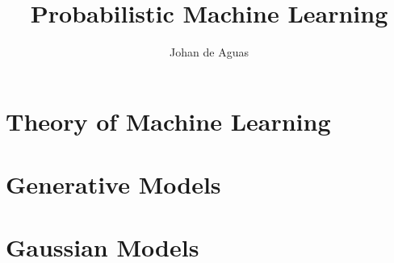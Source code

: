 \documentclass{xclass}
\begin{document}
\begin{titlepage}
    \title{Probabilistic Machine Learning}
    \author{Johan de Aguas}
    \maketitle
\end{titlepage}

\tableofcontents

\chapter{Theory of Machine Learning}



\chapter{Generative Models}



\chapter{Gaussian Models}



%

\end{document}
